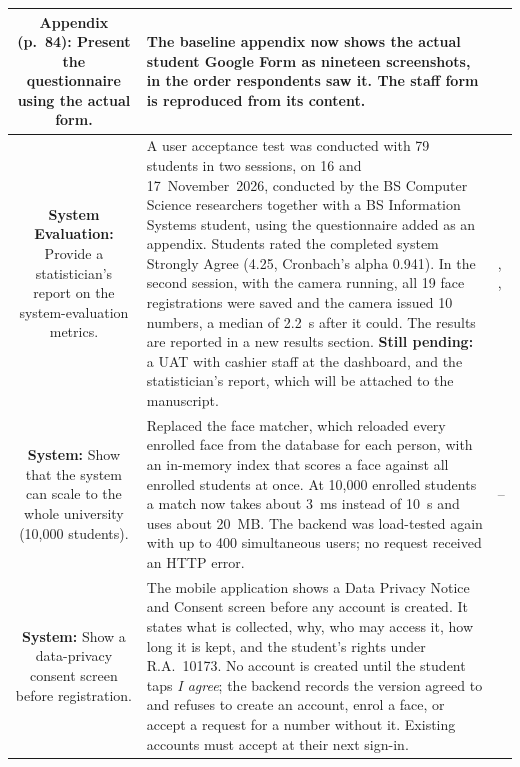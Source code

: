 \documentclass[12pt,letterpaper]{article}
\newcommand{\pg}[1]{\large #1}
\begin{document}
\begin{longtable}{|S|A|P|}
\textbf{Appendix (p.~84):}\newline
Present the questionnaire using the actual form.
&
The baseline appendix now shows the actual student Google Form as
nineteen screenshots, in the order respondents saw it. The staff form
is reproduced from its content.
&
\pg{\pageref{app:sop1-questionnaire}} \\ \hline

\textbf{System Evaluation:}\newline
Provide a statistician's report on the system-evaluation metrics.
&
A user acceptance test was conducted with 79 students in two sessions,
on 16 and 17~November~2026, conducted by the BS Computer Science
researchers together with a BS Information Systems student, using the
questionnaire added as an appendix. Students rated the
completed system Strongly Agree (4.25, Cronbach's alpha 0.941). In the
second session, with the camera running, all 19 face registrations were
saved and the camera issued 10 numbers, a median of 2.2~s after it
could. The results are reported in a new results section. \textbf{Still
pending:} a UAT with cashier staff at the dashboard, and the
statistician's report, which will be attached to the manuscript.
&
\pg{\pageref{cr:uat}, \pageref{sec:uat-results}, \pageref{app:uat}} \\ \hline

\textbf{System:}\newline
Show that the system can scale to the whole university (10,000
students).
&
Replaced the face matcher, which reloaded every enrolled face from the
database for each person, with an in-memory index that scores a face
against all enrolled students at once. At 10,000 enrolled students a
match now takes about 3~ms instead of 10~s and uses about 20~MB. The
backend was load-tested again with up to 400 simultaneous users; no
request received an HTTP error.
&
\pg{\pageref{subsec:load-test}--\pageref{tab:scale-load}} \\ \hline

\textbf{System:}\newline
Show a data-privacy consent screen before registration.
&
The mobile application shows a Data Privacy Notice and Consent screen
before any account is created. It states what is collected, why, who
may access it, how long it is kept, and the student's rights under
R.A.~10173. No account is created until the student taps
\emph{I agree}; the backend records the version agreed to and refuses
to create an account, enrol a face, or accept a request for a number
without it. Existing accounts must accept at their next sign-in.
&
\pg{\pageref{cr:consent}} \\ \hline


\end{longtable}
\end{document}
